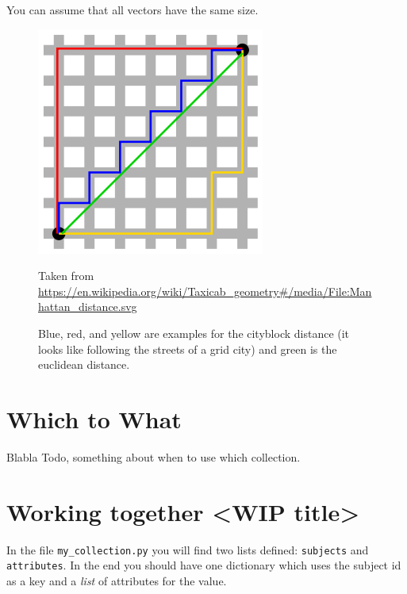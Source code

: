 You can assume that all vectors have the same size.
\begin{figure}[h]
  \includegraphics[scale=0.5]{metriken}
  \caption{Blue, red, and yellow are examples for the cityblock distance (it looks like following the streets of a grid city) and green is the euclidean distance.}
  \small{Taken from \url{https://en.wikipedia.org/wiki/Taxicab_geometry#/media/File:Manhattan_distance.svg}}
  \label{fig:metrics}
  
\end{figure}

\section{Which to What}
Blabla Todo, something about when to use which collection.

\section{Working together <WIP title>}
In the file \texttt{my\_collection.py} you will find two lists defined: \texttt{subjects} and \texttt{attributes}. 
In the end you should have one dictionary which uses the subject id as a key and a \textit{list} of attributes for the value.

